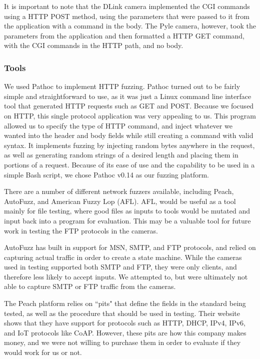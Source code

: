 \documentclass[letterpaper,twocolumn,10pt]{article}
\begin{document}
It is important to note that the DLink camera implemented the CGI commands using a HTTP POST method, using the parameters that were passed to it from the application with a command in the body. The Pyle camera, however, took the parameters from the application and then formatted a HTTP GET command, with the CGI commands in the HTTP path, and no body.


\subsubsection{Tools}
We used Pathoc to implement HTTP fuzzing. Pathoc turned out to be fairly simple and straightforward to use, as it was just a Linux command line interface tool that generated HTTP requests such as GET and POST. Because we focused on HTTP, this single protocol application was very appealing to us. This program allowed us to specify the type of HTTP command, and inject whatever we wanted into the header and body fields while still creating a command with valid syntax. It implements fuzzing by injecting random bytes anywhere in the request, as well as generating random strings of a desired length and placing them in portions of a request. Because of its ease of use and the capability to be used in a simple Bash script, we chose Pathoc v0.14 as our fuzzing platform.

There are a number of different network fuzzers available, including Peach, AutoFuzz, and American Fuzzy Lop (AFL). AFL, would be useful as a tool mainly for file testing, where good files as inputs to tools would be mutated and input back into a program for evaluation. This may be a valuable tool for future work in testing the FTP protocols in the cameras.

AutoFuzz has built in support for MSN, SMTP, and FTP protocols, and relied on capturing actual traffic in order to create a state machine. While the cameras used in testing supported both SMTP and FTP, they were only clients, and therefore less likely to accept inputs. We attempted to, but were ultimately not able to capture SMTP or FTP traffic from the cameras.

The Peach platform relies on ``pits" that define the fields in the standard being tested, as well as the procedure that should be used in testing. Their website shows that they have support for protocols such as HTTP, DHCP, IPv4, IPv6, and IoT protocols like CoAP. However, these pits are how this company makes money, and we were not willing to purchase them in order to evaluate if they would work for us or not.
\end{document}
